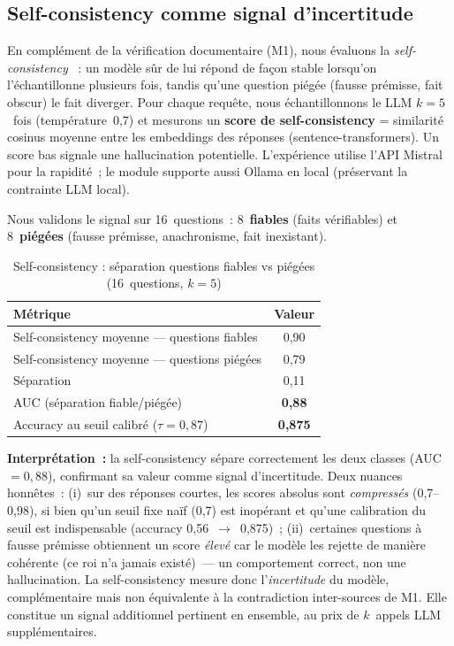 \documentclass[12pt,a4paper]{article}
\begin{document}
\subsection{Self-consistency comme signal d'incertitude}
\label{sec:selfcons}

En complément de la vérification documentaire (M1), nous évaluons la \emph{self-consistency} \cite{wang2022selfconsistency}~: un modèle sûr de lui répond de façon stable lorsqu'on l'échantillonne plusieurs fois, tandis qu'une question piégée (fausse prémisse, fait obscur) le fait diverger. Pour chaque requête, nous échantillonnons le LLM $k=5$~fois (température~0,7) et mesurons un \textbf{score de self-consistency} = similarité cosinus moyenne entre les embeddings des réponses (sentence-transformers). Un score bas signale une hallucination potentielle. L'expérience utilise l'API Mistral pour la rapidité~; le module supporte aussi Ollama en local (préservant la contrainte \og{}LLM local\fg{}).

Nous validons le signal sur 16~questions~: 8~\textbf{fiables} (faits vérifiables) et 8~\textbf{piégées} (fausse prémisse, anachronisme, fait inexistant).

\begin{table}[H]
\centering
\caption{Self-consistency : séparation questions fiables vs piégées (16~questions, $k=5$)}
\label{tab:selfcons}
\renewcommand{\arraystretch}{1.2}
\begin{tabular}{lc}
\toprule
\textbf{Métrique} & \textbf{Valeur} \\
\midrule
Self-consistency moyenne --- questions fiables & 0,90 \\
Self-consistency moyenne --- questions piégées & 0,79 \\
Séparation & 0,11 \\
AUC (séparation fiable/piégée) & \textbf{0,88} \\
Accuracy au seuil calibré ($\tau=0{,}87$) & \textbf{0,875} \\
\bottomrule
\end{tabular}
\end{table}

\textbf{Interprétation~:} la self-consistency sépare correctement les deux classes (AUC~$=0{,}88$), confirmant sa valeur comme signal d'incertitude. Deux nuances honnêtes~: (i)~sur des réponses courtes, les scores absolus sont \emph{compressés} (0,7--0,98), si bien qu'un seuil fixe naïf (0,7) est inopérant et qu'une calibration du seuil est indispensable (accuracy 0,56~$\to$~0,875)~; (ii)~certaines questions à fausse prémisse obtiennent un score \emph{élevé} car le modèle les rejette de manière cohérente (\og{}ce roi n'a jamais existé\fg{})~--- un comportement correct, non une hallucination. La self-consistency mesure donc l'\emph{incertitude} du modèle, complémentaire mais non équivalente à la contradiction inter-sources de M1. Elle constitue un signal additionnel pertinent en ensemble, au prix de $k$~appels LLM supplémentaires.
\end{document}
